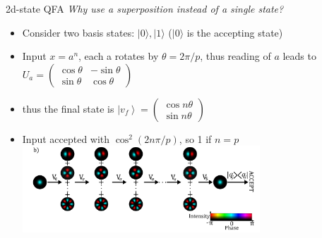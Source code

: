 \documentclass[aspectratio=169,9pt]{beamer}
\begin{document}
\begin{frame}[t]{2d-state QFA}
  \textit{Why use a superposition instead of a single state?}
  \begin{itemize}
    \item Consider two basis states: $|0\rangle,|1\rangle$ ($|0\rangle$ is the accepting state)
    \item Input $x=a^n$, each a rotates by $\theta=2\pi/p$, thus reading of $a$
    leads to $U_{a}=\left(\begin{array}{rr}\cos \theta & -\sin \theta \\ \sin \theta & \cos \theta\end{array}\right)$
    \item thus the final state is $\left|v_{f}\right\rangle=\left(\begin{array}{c}\cos n \theta \\ \sin n \theta\end{array}\right)$
    \item Input accepted with $\cos^2(2n\pi/p)$, so 1 if $n=p$
    \includegraphics[width=0.7\textwidth]{2dstate.png}
  \end{itemize}
\end{frame}



\end{document}

